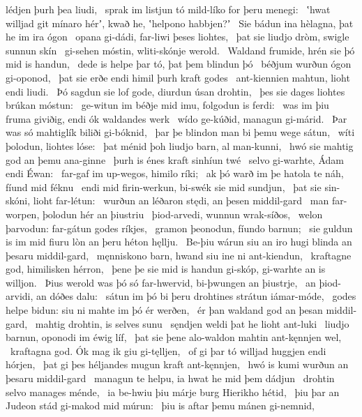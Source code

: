 lédjen þurh þea liudi, \hld\ sprak im listjun tó
mild-líko for þeru menegi: \hld\ ʽhwat willjad git mínaro hérʼ, kwað he,
ʽhelpono habbjen?ʼ \hld\ Sie bádun ina hèlagna,
þat he im ira ógon \hld\ opana gi-dádi,
far-liwi þeses liohtes, \hld\ þat sie liudjo dròm,
swigle sunnun skín \hld\ gi-sehen móstin,
wliti-skónje werold. \hld\ Waldand frumide,
hrén sie þó mid is handun, \hld\ dede is helpe þar tó,
þat þem blindun þó \hld\ béðjum wurðun
ógon gi-oponod, \hld\ þat sie erðe endi himil
þurh kraft godes \hld\ ant-kiennien mahtun,
lioht endi liudi. \hld\ Þó sagdun sie lof gode,
diurdun úsan drohtin, \hld\ þes sie dages liohtes
brúkan móstun: \hld\ ge-witun im béðje mid imu,
folgodun is ferdi: \hld\ was im þiu fruma giviðig,
endi ók waldandes werk \hld\ wído ge-kúðid,
managun gi-márid. \hld\ Þar was só mahtiglík
biliði gi-bóknid, \hld\ þar þe blindon man
bi þemu wege sátun, \hld\ wíti þolodun,
liohtes lóse: \hld\ þat ménid þoh liudjo barn,
al man-kunni, \hld\ hwó sie mahtig god
an þemu ana-ginne \hld\ þurh is énes kraft
sinhíun twé \hld\ selvo gi-warhte,
Ádam endi Éwan: \hld\ far-gaf im up-wegos,
himilo ríki; \hld\ ak þó warð im þe hatola te náh,
fíund mid féknu \hld\ endi mid firin-werkun,
bi-swék sie mid sundjun, \hld\ þat sie sin-skóni,
lioht far-létun: \hld\ wurðun an léðaron stędi,
an þesen middil-gard \hld\ man far-worpen,
þolodun hér an þiustriu \hld\ þiod-arvedi,
wunnun wrak-síðos, \hld\ welon þarvodun:
far-gátun godes ríkjes, \hld\ gramon þeonodun,
fíundo barnun; \hld\ sie guldun is im mid fiuru lòn
an þeru héton hęllju. \hld\ Be-þiu wárun siu an iro hugi blinda
an þesaru middil-gard, \hld\ męnniskono barn,
hwand siu ine ni ant-kiendun, \hld\ kraftagne god,
himilisken hérron, \hld\ þene þe sie mid is handun gi-skóp,
gi-warhte an is willjon. \hld\ Þius werold was þó só far-hwervid,
bi-þwungen an þiustrje, \hld\ an þiod-arvidi,
an dóðes dalu: \hld\ sátun im þó bi þeru drohtines strátun
iámar-móde, \hld\ godes helpe bidun:
siu ni mahte im þó ér werðen, \hld\ ér þan waldand god
an þesan middil-gard, \hld\ mahtig drohtin,
is selves sunu \hld\ sęndjen weldi
þat he lioht ant-luki \hld\ liudjo barnun,
oponodi im éwig líf, \hld\ þat sie þene alo-waldon
mahtin ant-kęnnjen wel, \hld\ kraftagna god.
Ók mag ik giu gi-tęlljen, \hld\ of gi þar tó willjad
huggjen endi hórjen, \hld\ þat gi þes héljandes mugun
kraft ant-kęnnjen, \hld\ hwó is kumi wurðun
an þesaru middil-gard \hld\ managun te helpu,
ia hwat he mid þem dádjun \hld\ drohtin selvo
manages ménde, \hld\ ia be-hwiu þiu márje burg
Hierikho hétid, \hld\ þiu þar an Judeon stád
gi-makod mid múrun: \hld\ þiu is aftar þemu mánen gi-nemnid,
